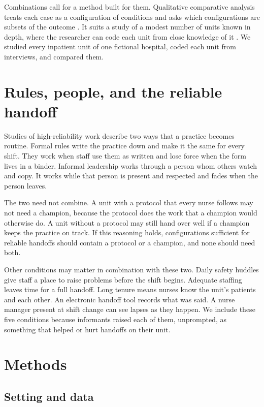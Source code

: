 \documentclass[12pt]{article}
\begin{document}
Combinations call for a method built for them. Qualitative comparative analysis treats each case as a configuration of conditions and asks which configurations are subsets of the outcome \citep{ragin1987,ragin2008}. It suits a study of a modest number of units known in depth, where the researcher can code each unit from close knowledge of it \citep{fiss2011,greckhamer2018}. We studied every inpatient unit of one fictional hospital, coded each unit from interviews, and compared them.

\section{Rules, people, and the reliable handoff}

Studies of high-reliability work describe two ways that a practice becomes routine. Formal rules write the practice down and make it the same for every shift. They work when staff use them as written and lose force when the form lives in a binder. Informal leadership works through a person whom others watch and copy. It works while that person is present and respected and fades when the person leaves.

The two need not combine. A unit with a protocol that every nurse follows may not need a champion, because the protocol does the work that a champion would otherwise do. A unit without a protocol may still hand over well if a champion keeps the practice on track. If this reasoning holds, configurations sufficient for reliable handoffs should contain a protocol or a champion, and none should need both.

Other conditions may matter in combination with these two. Daily safety huddles give staff a place to raise problems before the shift begins. Adequate staffing leaves time for a full handoff. Long tenure means nurses know the unit's patients and each other. An electronic handoff tool records what was said. A nurse manager present at shift change can see lapses as they happen. We include these five conditions because informants raised each of them, unprompted, as something that helped or hurt handoffs on their unit.

\section{Methods}

\subsection{Setting and data}
\end{document}
